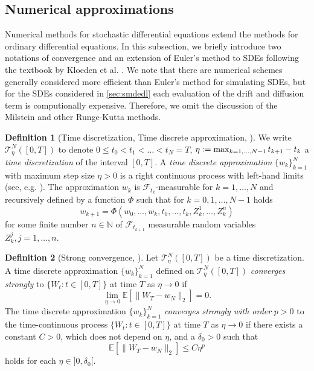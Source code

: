 \documentclass[12pt]{article}
\theoremstyle{definition}
\newtheorem{definition}[definition]{Definition}
\numberwithin{equation}{section}
\newcommand{\N}{\mathbb{N}}
\newcommand{\ev}[1]{\mathbb{E}\left[{#1}\right]}
\newcommand{\norm}[1]{\lVert{#1}\rVert_2}
\newcommand{\defeq}{\vcentcolon=}
\begin{document}
\subsection{Numerical approximations}
\label{subsec:sde_numerical_methods}
Numerical methods for stochastic differential equations extend the methods for ordinary differential equations. In this subsection, we briefly introduce two notations of convergence and an extension of Euler's method to SDEs following the textbook by Kloeden et al. \cite{kloedenNumericalSolutionStochastic2013}. We note that there are numerical schemes generally considered more efficient than Euler's method for simulating SDEs, but for the SDEs considered in \autoref{sec:smdedl} each evaluation of the drift and diffusion term is computionally expensive. Therefore, we omit the discussion of the Milstein and other Runge-Kutta methods.
\begin{definition}[Time discretization, Time discrete approximation, ]
  We write $\mathcal{T}_\eta^N([0,T])$ to denote $0 \leq t_0 < t_1 < \dots < t_N = T$, $\eta \defeq \max_{k=1,\dots,N-1} t_{k+1} - t_k$ a \emph{time discretization} of the interval $[0,T]$.
  A \emph{time discrete approximation} $\{w_k\}_{k=1}^N$ with maximum step size $\eta > 0$ is a right continuous process with left-hand limits (see, e.g. \cite[pp.~65]{kloedenNumericalSolutionStochastic2013}). The approximation $w_k$ is $\mathcal{F}_{t_k}$-measurable for $k=1,\dots,N$ and recursively defined by a function $\Phi$ such that for $k=0,1,\dots,N-1$ holds
  \begin{equation}
    w_{k+1} = \Phi(w_0, \dots, w_k, t_0, \dots, t_k, Z^1_k,\dots, Z_k^n)
  \end{equation}
  for some finite number $n \in \N$ of $\mathcal{F}_{t_{k+1}}$ measurable random variables $Z^j_k, j = 1,\dots,n$. 
\end{definition}
\begin{definition}[Strong convergence, ]
  \label{def:strong_convergence}
  Let $\mathcal{T}_\eta^N([0,T])$ be a time discretization. A time discrete approximation $\{w_k\}_{k=1}^N$ defined on $\mathcal{T}_\eta^N([0,T])$ \emph{converges strongly} to $\{W_t:t\in [0,T] \}$ at time $T$ as $\eta \rightarrow 0$ if 
  \begin{equation*}
    \lim_{\eta \rightarrow 0} \ev{\norm{W_{T} - w_N}} = 0.
  \end{equation*}
  The time discrete approximation $\{w_k\}_{k=1}^N$ \emph{converges strongly with order} $p>0$ to the time-continuous process $\{W_t:t\in [0,T] \}$ at time $T$ as $\eta \rightarrow 0$ if there exists a constant $C > 0$, which does not depend on $\eta$, and a $\delta_0 > 0$ such that 
  \begin{equation*}
    \ev{\norm{W_T - w_N}} \leq C \eta^p
  \end{equation*}
  holds for each $\eta \in ]0, \delta_0[$.
\end{definition}
\end{document}
